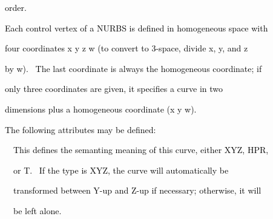 \documentclass[a4paper]{article}
\newcommand\textstyleOOoComputerKeyWord[1]{\textrm{\textcolor[rgb]{0.0,0.0,0.5019608}{#1}}}
\newcommand\textstyleOOoAssemblerSpecialChar[1]{\textrm{\textcolor[rgb]{0.0,0.5019608,0.0}{#1}}}
\newcommand\textstyleOOoAssemblerIdent[1]{\textrm{\textcolor{black}{#1}}}
\begin{document}
{\color{black}
\textstyleOOoComputerKeyWord{\textcolor{black}{\ \ order.}}}


\bigskip

{\color{black}
\textstyleOOoComputerKeyWord{\textcolor{black}{\ \ Each control vertex of a NURBS is defined in homogeneous space
with}}}

{\color{black}
\textstyleOOoComputerKeyWord{\textcolor{black}{\ \ four coordinates x y z w (to convert to 3-space, divide x, y, and
z}}}

{\color{black}
\textstyleOOoComputerKeyWord{\textcolor{black}{\ \ by w). \ The last coordinate is always the homogeneous coordinate;
if}}}

{\color{black}
\textstyleOOoComputerKeyWord{\textcolor{black}{\ \ only three coordinates are given, it specifies a curve in two}}}

{\color{black}
\textstyleOOoComputerKeyWord{\textcolor{black}{\ \ dimensions plus a homogeneous coordinate (x y w).}}}


\bigskip

{\color{black}
\textstyleOOoComputerKeyWord{\textcolor{black}{\ \ The following attributes may be defined:}}}

\clearpage{\color{black}
\textstyleOOoComputerKeyWord{\textcolor{black}{\ \ }}\textstyleOOoAssemblerSpecialChar{{\textless}}\textstyleOOoAssemblerIdent{Scalar}\textstyleOOoAssemblerSpecialChar{{\textgreater}}\textstyleOOoComputerKeyWord{\textcolor{black}{
}}\textstyleOOoAssemblerIdent{type}\textstyleOOoComputerKeyWord{\textcolor{black}{
}}\textstyleOOoAssemblerSpecialChar{\{}\textstyleOOoComputerKeyWord{\textcolor{black}{
}}\textstyleOOoAssemblerIdent{curve}\textstyleOOoAssemblerSpecialChar{{}-}\textstyleOOoAssemblerIdent{type}\textstyleOOoComputerKeyWord{\textcolor{black}{
}}\textstyleOOoAssemblerSpecialChar{\}}}


\bigskip

{\color{black}
\textstyleOOoComputerKeyWord{\textcolor{black}{\ \ \ \ This defines the semanting meaning of this curve, either XYZ,
HPR,}}}

{\color{black}
\textstyleOOoComputerKeyWord{\textcolor{black}{\ \ \ \ or T. \ If the type is XYZ, the curve will automatically be}}}

{\color{black}
\textstyleOOoComputerKeyWord{\textcolor{black}{\ \ \ \ transformed between Y-up and Z-up if necessary; otherwise, it
will}}}

{\color{black}
\textstyleOOoComputerKeyWord{\textcolor{black}{\ \ \ \ be left alone.}}}
\end{document}
